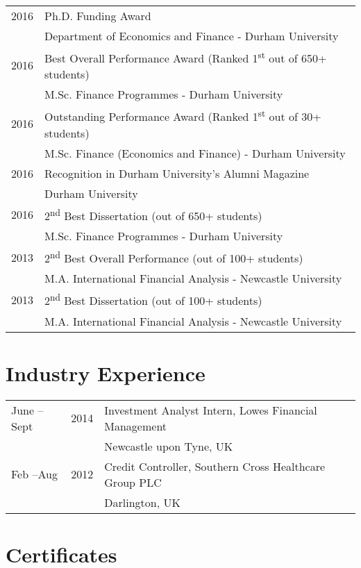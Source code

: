 \documentclass[margin,line,pifont,palatino,courier]{res}
\newcommand{\ts}{\textsuperscript}
\begin{document}
\begin{resume}
\begin{longtable}{@{}p{0.7in}p{4in}}
2016 & Ph.D. Funding Award \\
           &Department of Economics and Finance - Durham University  \\
\rule{0pt}{4ex}2016 & Best Overall Performance Award (Ranked 1\ts{st} out of 650+ students)  \\
           & M.Sc. Finance Programmes - Durham University  \\
\rule{0pt}{4ex}2016 & Outstanding Performance Award (Ranked 1\ts{st} out of 30+ students)  \\
           & M.Sc. Finance (Economics and Finance) - Durham University  \\
\rule{0pt}{4ex}2016 & Recognition in Durham University's Alumni Magazine\\
           & Durham University\\
\rule{0pt}{4ex}2016 & 2\ts{nd} Best Dissertation (out of 650+ students)\\
           & M.Sc. Finance Programmes - Durham University\\
\rule{0pt}{4ex}2013 & 2\ts{nd} Best Overall Performance (out of 100+ students)\\
           & M.A. International Financial Analysis - Newcastle University\\
\rule{0pt}{4ex}2013 & 2\ts{nd} Best Dissertation (out of 100+ students)\\
           & M.A. International Financial Analysis - Newcastle University
\end{longtable}

\hrulefill

\section{\sc \bf Industry Experience}

\begin{tabular}{@{}p{0.8in}p{0.5in}p{4in}}

June --Sept&2014 & Investment Analyst Intern, Lowes Financial Management \\
&&Newcastle upon Tyne, UK\\
\rule{0pt}{4ex}Feb --Aug & 2012& Credit Controller, Southern Cross Healthcare Group PLC \\
&&Darlington, UK
\end{tabular}

\hrulefill

\section{\sc \bf Certificates}


\end{resume}
\end{document}
